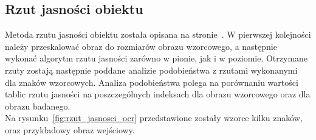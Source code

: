 \subsection{Rzut jasności obiektu}
Metoda rzutu jasności obiektu została opisana na stronie~\pageref{ssec:rzut_jasnosci}. W pierwszej kolejności należy przeskalować obraz do rozmiarów obrazu wzorcowego, a następnie wykonać algorytm rzutu jasności zarówno w pionie, jak i w poziomie. Otrzymane rzuty zostają następnie poddane analizie podobieństwa z rzutami wykonanymi dla znaków wzorcowych. Analiza podobieństwa polega na porównaniu wartości tablic rzutu jasności na poszczególnych indeksach dla obrazu wzorcowego oraz dla obrazu badanego. \\
Na rysunku~\ref{fig:rzut_jasnosci_ocr} przedstawione zostały wzorce kilku znaków, oraz przykładowy obraz wejściowy.

